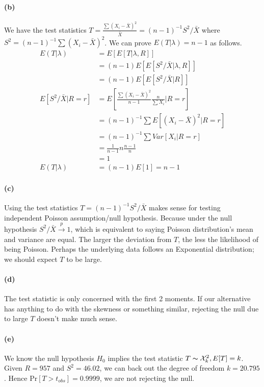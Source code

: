 \documentclass[11pt, letterpaper]{article}
\begin{document}
\newpage
\paragraph{(b)} 
We have the test statistics $T = \frac{\sum (X_i - \bar{X})^2}{\bar{X}} = (n-1)^{-1} S^2/\bar{X}$ where $S^2 = (n-1)^{-1} \sum(X_i - \bar{X})^2$. We can prove $E(T|\lambda) = n-1$ as follows.
\begin{align*}
    E(T|\lambda) &= E[E[T|\lambda, R]] \\
        &= (n-1) E[E[S^2/\bar{X}|\lambda, R]] \\
        &= (n-1) E[E[S^2/\bar{X}|R]] \\
    E[S^2/\bar{X}|R=r] &= E \left[\frac{\sum (X_i-\bar{X})^2}{n-1} \frac{n}{\sum X_i} | R=r \right] \\
        &= (n-1)^{-1} \sum E[(X_i-\bar{X})^2|R=r] \\
        &= (n-1)^{-1} \sum Var[X_i|R=r] \\
        &= \frac{1}{n-1} n \frac{n-1}{n} \\
        &= 1 \\
    E(T|\lambda) &= (n-1) E[1] = n-1
\end{align*}

\paragraph{(c)}
Using the test statistics $T = (n-1)^{-1} S^2/\bar{X}$ makes sense for testing independent Poisson assumption/null hypothesis. Because under the null hypothesis $S^2/\bar{X} \xrightarrow{p} 1$, which is equivalent to saying Poisson distribution's mean and variance are equal. The larger the deviation from $T$, the less the likelihood of being Poisson. Perhaps the underlying data follows an Exponential distribution; we should expect $T$ to be large.

\paragraph{(d)}
The test statistic is only concerned with the first 2 moments. If our alternative has anything to do with the skewness or something similar, rejecting the null due to large $T$ doesn't make much sense.

\paragraph{(e)}
We know the null hypothesis $H_0$ implies the test statistic $T \thicksim \mathcal{X}^2_{k}, E[T] = k$. Given $R = 957$ and $S^2 = 46.02$, we can back out the degree of freedom $k = 20.795$. Hence $\text{Pr}[T>t_{obs}] = 0.9999$, we are not rejecting the null.
\end{document}
